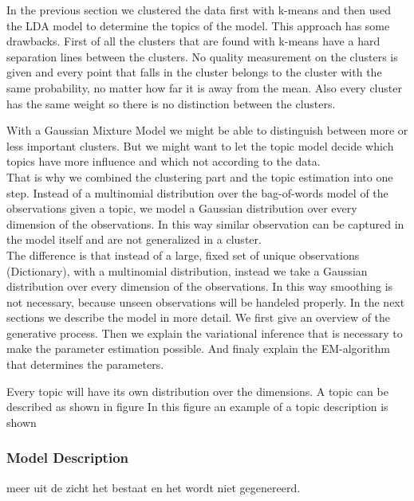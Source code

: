 \documentclass[11pt,a4paper]{article}
\begin{document}
In the previous section we clustered the data first with k-means and then used the LDA model to determine the topics of the model. This approach has some drawbacks. First of all the clusters that are found with k-means have a hard separation lines between the clusters. No quality measurement on the clusters is given and every point that falls in the cluster belongs to the cluster with the same probability, no matter how far it is away from the mean. Also every cluster has the same weight so there is no distinction between the clusters.

With a Gaussian Mixture Model we might be able to distinguish between more or less important clusters. But we might want to let the topic model decide which topics have more influence and which not according to the data.\\
That is why we combined the clustering part and the topic estimation into one step. Instead of a multinomial distribution over the bag-of-words model of the observations given a topic, we model a Gaussian distribution over every dimension of the observations. In this way similar observation can be captured in the model itself and are not generalized in a cluster.\\
The difference is that instead of a large, fixed set of unique observations (Dictionary), with a multinomial distribution, instead we take a Gaussian distribution over every dimension of the observations. In this way smoothing is not necessary, because unseen observations will be handeled properly.
In the next sections we describe the model in more detail. We first give an overview of the generative process. Then we explain the variational inference that is necessary to make the parameter estimation possible. And finaly explain the EM-algorithm that determines the parameters.

Every topic will have its own distribution over the dimensions. A
topic can be described as shown in figure %
In this figure an example of a topic description is shown

  \subsubsection{Model Description}
   meer uit de zicht het bestaat en het wordt niet gegenereerd.
  
\end{document}
